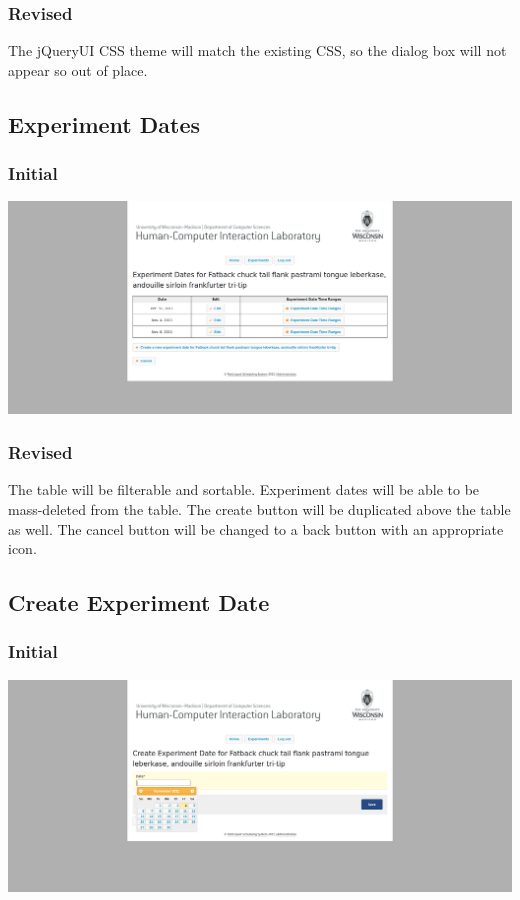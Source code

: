 \subsubsection{Revised}
The jQueryUI CSS theme will match the existing CSS, so the dialog box will not appear so out of place.

\subsection{Experiment Dates}
\subsubsection{Initial}
\includegraphics[width=6in]{../other/initial-interface-design/experiment-dates.png}
\subsubsection{Revised}
The table will be filterable and sortable. Experiment dates will be able to be mass-deleted from the table. The create button will be duplicated above the table as well. The cancel button will be changed to a back button with an appropriate icon.

\subsection{Create Experiment Date}
\subsubsection{Initial}
\includegraphics[width=6in]{../other/initial-interface-design/create-experiment-date.png}
